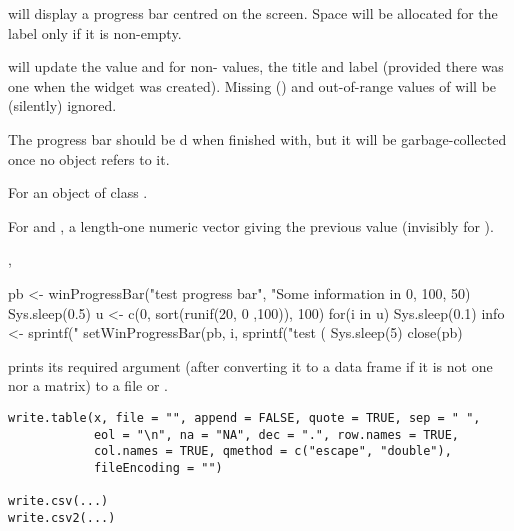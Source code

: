%
\begin{Details}\relax
{} will display a progress bar centred on the
screen.  Space will be allocated for the label only if it is non-empty.

 will update the value and for non-
values, the title and label (provided there was one when the widget
was created).  Missing () and out-of-range values of
 will be (silently) ignored.

The progress bar should be d when finished with, but it
will be garbage-collected once no \R{} object refers to it. 
\end{Details}
%
\begin{Value}
For  an object of class .

For  and , a
length-one numeric vector giving the previous value (invisibly for
).
\end{Value}
%
\begin{SeeAlso}\relax
{}, 
\end{SeeAlso}
%
\begin{Examples}
\begin{ExampleCode}

pb <- winProgressBar("test progress bar", "Some information in %
                     0, 100, 50)
Sys.sleep(0.5)
u <- c(0, sort(runif(20, 0 ,100)), 100)
for(i in u) {
    Sys.sleep(0.1)
    info <- sprintf("%
    setWinProgressBar(pb, i, sprintf("test (%
}
Sys.sleep(5)
close(pb)
\end{ExampleCode}
\end{Examples}
%
\begin{Description}\relax
{} prints its required argument  (after
converting it to a data frame if it is not one nor a matrix) to
a file or .
\end{Description}
%
\begin{Usage}
\begin{verbatim}
write.table(x, file = "", append = FALSE, quote = TRUE, sep = " ",
            eol = "\n", na = "NA", dec = ".", row.names = TRUE,
            col.names = TRUE, qmethod = c("escape", "double"),
            fileEncoding = "")

write.csv(...)
write.csv2(...)
\end{verbatim}
\end{Usage}
